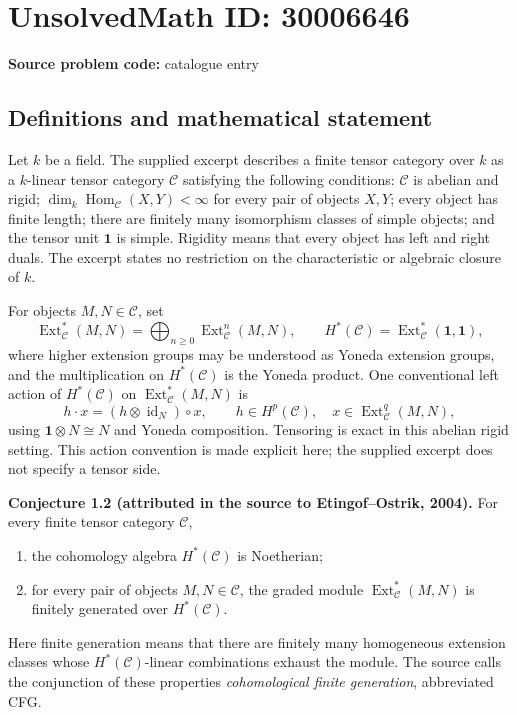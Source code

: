 \documentclass[11pt]{article}
\begin{document}
\section*{UnsolvedMath ID: 30006646}
\textbf{Source problem code:} catalogue entry
\subsection{Definitions and mathematical statement}
Let \(k\) be a field. The supplied excerpt describes a finite tensor category over \(k\) as a \(k\)-linear tensor category \(\mathcal C\) satisfying the following conditions: \(\mathcal C\) is abelian and rigid; \(\dim_k\operatorname{Hom}_{\mathcal C}(X,Y)<\infty\) for every pair of objects \(X,Y\); every object has finite length; there are finitely many isomorphism classes of simple objects; and the tensor unit \(\mathbf 1\) is simple. Rigidity means that every object has left and right duals. The excerpt states no restriction on the characteristic or algebraic closure of \(k\).

For objects \(M,N\in\mathcal C\), set
\[
\operatorname{Ext}^{*}_{\mathcal C}(M,N)
=\bigoplus_{n\geq 0}\operatorname{Ext}^{n}_{\mathcal C}(M,N),
\qquad
H^{*}(\mathcal C)
=\operatorname{Ext}^{*}_{\mathcal C}(\mathbf 1,\mathbf 1),
\]
where higher extension groups may be understood as Yoneda extension groups, and the multiplication on \(H^{*}(\mathcal C)\) is the Yoneda product. One conventional left action of \(H^{*}(\mathcal C)\) on \(\operatorname{Ext}^{*}_{\mathcal C}(M,N)\) is
\[
h\cdot x=(h\otimes\operatorname{id}_N)\circ x,
\qquad
h\in H^p(\mathcal C),\quad
x\in\operatorname{Ext}^{q}_{\mathcal C}(M,N),
\]
using \(\mathbf 1\otimes N\cong N\) and Yoneda composition. Tensoring is exact in this abelian rigid setting. This action convention is made explicit here; the supplied excerpt does not specify a tensor side.

\textbf{Conjecture 1.2 (attributed in the source to Etingof--Ostrik, 2004).} For every finite tensor category \(\mathcal C\),
\begin{enumerate}
\item the cohomology algebra \(H^{*}(\mathcal C)\) is Noetherian;
\item for every pair of objects \(M,N\in\mathcal C\), the graded module \(\operatorname{Ext}^{*}_{\mathcal C}(M,N)\) is finitely generated over \(H^{*}(\mathcal C)\).
\end{enumerate}
Here finite generation means that there are finitely many homogeneous extension classes whose \(H^{*}(\mathcal C)\)-linear combinations exhaust the module. The source calls the conjunction of these properties \emph{cohomological finite generation}, abbreviated CFG.
\end{document}
